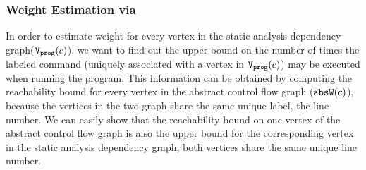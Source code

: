 \subsubsection{Weight Estimation via }
\label{sec:alg_weightgen}
%




{In order to estimate weight for every vertex in the static analysis dependency graph($\mathtt{{V_{prog}}}(c)$), we want to find out the upper bound on 
the number of times the labeled command (uniquely associated with a vertex in $\mathtt{{V_{prog}}}(c)$) may be executed when running the program.
This information can be obtained by computing the reachability bound for every vertex in the abstract control flow graph ($\mathtt{abs}{\mathtt{W}}(c)$), because
the vertices in the two graph share the same unique label, the line number. We can easily show that the reachability bound on one vertex of the abstract control flow graph is also the upper bound for the corresponding vertex in the static analysis dependency graph, both vertices share the same unique line number.}


